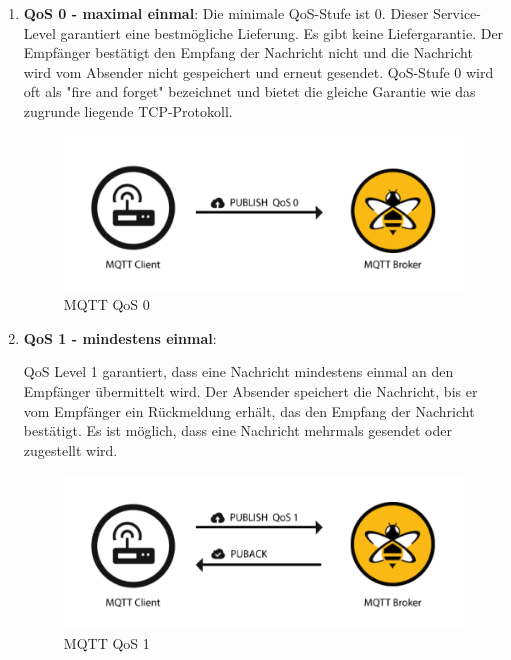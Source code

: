 \begin{enumerate}
    \item \textbf{QoS 0 - maximal einmal}:
    Die minimale QoS-Stufe ist 0. Dieser Service-Level garantiert eine bestmögliche Lieferung. Es gibt keine Liefergarantie. Der Empfänger bestätigt den Empfang der Nachricht nicht und die Nachricht wird vom Absender nicht gespeichert und erneut gesendet. QoS-Stufe 0 wird oft als "fire and forget" bezeichnet und bietet die gleiche Garantie wie das zugrunde liegende TCP-Protokoll. 

    \begin{figure}[H]
        \begin{center}
            \includegraphics[scale=0.8]{images/QoS-0.png}
            \caption{MQTT QoS 0 \cite{hivemq}}
        \end{center}
    \end{figure}

    \item \textbf{QoS 1 - mindestens einmal}:
    
    QoS Level 1 garantiert, dass eine Nachricht mindestens einmal an den Empfänger übermittelt wird. Der Absender speichert die Nachricht, bis er vom Empfänger ein Rückmeldung erhält, das den Empfang der Nachricht bestätigt. Es ist möglich, dass eine Nachricht mehrmals gesendet oder zugestellt wird.

    \begin{figure}[H]
        \begin{center}
            \includegraphics[scale=0.8]{images/QoS-1.png}
            \caption{MQTT QoS 1 \cite{hivemq}}
        \end{center}
    \end{figure}


\end{enumerate}
